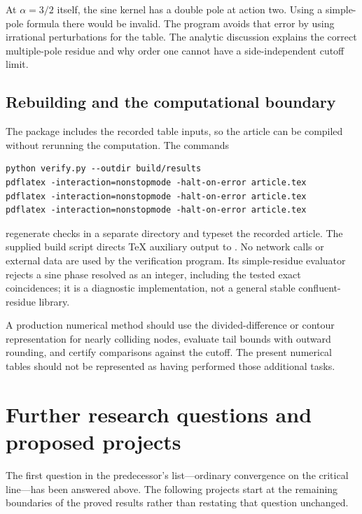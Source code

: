 \documentclass[11pt,a4paper]{article}
\numberwithin{equation}{section}
\theoremstyle{definition}
\theoremstyle{remark}
\begin{document}
\begin{table}[htbp]
\centering\small

\caption{A cutoff collision distinguishes boundedness from continuity.}
\label{tab:collision}
\end{table}

At $\alpha=3/2$ itself, the sine kernel has a double pole at action two.
Using a simple-pole formula there would be invalid. The program avoids
that error by using irrational perturbations for the table. The
analytic discussion explains the correct multiple-pole residue and
why order one cannot have a side-independent cutoff limit.

\subsection{Rebuilding and the computational boundary}
The package includes the recorded table inputs, so the article can be
compiled without rerunning the computation. The commands
\begin{verbatim}
python verify.py --outdir build/results
pdflatex -interaction=nonstopmode -halt-on-error article.tex
pdflatex -interaction=nonstopmode -halt-on-error article.tex
pdflatex -interaction=nonstopmode -halt-on-error article.tex
\end{verbatim}
regenerate checks in a separate directory and typeset the recorded
article. The supplied build script directs TeX auxiliary output to
. No network calls or external data are used by the
verification program. Its simple-residue evaluator rejects a sine phase resolved as an
integer, including the tested exact coincidences; it is a diagnostic implementation,
not a general stable confluent-residue library.

A production numerical method should use the divided-difference or
contour representation for nearly colliding nodes, evaluate tail bounds
with outward rounding, and certify comparisons against the cutoff.
The present numerical tables should not be represented as having
performed those additional tasks.

\section{Further research questions and proposed projects}
\label{sec:questions}
The first question in the predecessor's list---ordinary convergence on
the critical line---has been answered above. The following projects
start at the remaining boundaries of the proved results rather than
restating that question unchanged.
\end{document}
